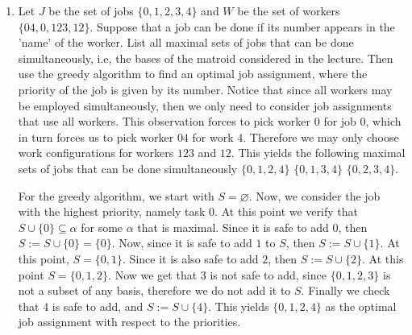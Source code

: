 \documentclass[12pt]{article}
\begin{document}
\begin{enumerate}
    \begin{proof}
    First we show that it has the inclusion property. Let $A \in S$ and $A' \subseteq A$. Since $A \in S$, then $A = X \cup Y$ that satisfy the defining conditions of $S$. Since $A' \subseteq A$, it follows that $A' = A' \cap (X \cup Y) = (A' \cap X) \cup  (A' \cap Y)$. Since $X \in S_1$ and $Y \in S_2$ which have the inclusion property, then $X' = (A' \cap X) \in S_1$ and $Y' =  A' \cap Y \in S_2$. This implies, from the definition of $S$ that $A' \in S$.
    
    Now we need to show that $S$ has the matroid property. Let $A, A' \in S$ such that $\vert A \vert < \vert A' \vert$. From the definition, it follows that $A = X \cup Y$ and $A' = X' \cup Y'$ that satisfy the building conditions from $S$. Notice that since $X \cup Y = \varnothing$ and $X' \cap Y' = \varnothing$, then either $\vert X \vert < \vert X' \vert$ or $\vert Y \vert < \vert Y' \vert$. Assume without loss of generality that $\vert X \vert < \vert X' \vert$. In this case, since $S_1$ has the matroid property, then there exists $v \in X' \setminus X$ such that $X \cup \{v\} \in S_1$. Therefore $A \cup \{v\} \in S$, since $A \cup \{v\} = (X \cup \{v\} ) \cup Y$. The case where $\vert Y \vert < \vert Y' \vert$ is symmetrical. This shows that $S$ has the matroid property, therefore completing the proof that $(E_1 \cup E_2, S)$ is a matroid.
    
    \end{proof}
    
    \item Let $J$ be the set of jobs $\{0,1,2,3,4\}$ and $W$ be the set of workers $\{ 04, 0, 123, 12 \}$. Suppose that a job can be done if its number appears in the 'name' of the worker.
    List all maximal sets of jobs that can be done simultaneously, i.e, the bases of the matroid considered in the lecture. Then use the greedy algorithm to find an optimal job assignment, where the priority of the job is given by its number.
    Notice that since all workers may be employed simultaneously, then we only need to consider job assignments that use all workers. This observation forces to pick worker $0$ for job $0$, which in turn forces us to pick worker $04$ for work $4$. Therefore we may only choose work configurations for workers $123$ and $12$. This yields the following maximal sets of jobs that can be done simultaneously $\{0,1,2,4\}$ $\{0,1,3,4\}$ $\{0,2,3,4\}$.
    
    For the greedy algorithm, we start with $S = \varnothing$. Now, we consider the job with the highest priority, namely task $0$. At this point we verify that $S \cup \{0 \} \subseteq \alpha$ for some $\alpha$ that is maximal. Since it is safe to add $0$, then $S := S \cup \{0\} = \{0\}$. Now, since it is safe to add $1$ to $S$, then $S := S \cup \{1\}$. At this point, $S = \{0,1\}$. Since it is also safe to add $2$, then $S:= S \cup \{2\}$. At this point $S = \{0,1,2\}$. Now we get that $3$ is not safe to add, since $\{0,1,2,3\}$ is not a subset of any basis, therefore we do not add it to $S$. Finally we check that $4$ is safe to add, and $S:= S \cup \{4\}$. This yields $\{0,1,2,4\}$ as the optimal job assignment with respect to the priorities.
    

\end{enumerate}
\end{document}
